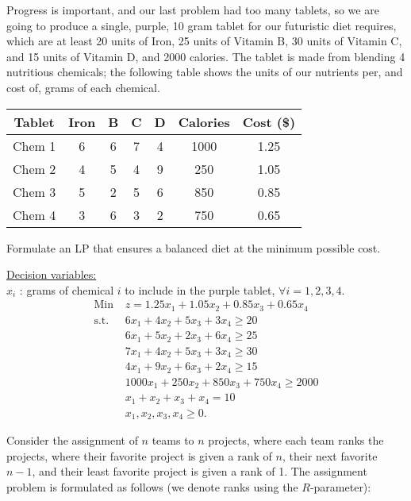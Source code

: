  Progress is important, and our last problem had too many tablets, so we are going to produce a single, purple, 10 gram tablet for our futuristic diet requires, which are at least 20 units of Iron, 25 units of Vitamin B, 30 units of Vitamin C, and 15 units of Vitamin D, and 2000 calories. The tablet is made from blending 4 nutritious chemicals; the following table shows the units of our nutrients per, and cost of, grams of each chemical.
\begin{table}[h!] \begin{center} \begin{tabular} {|c|c|c|c|c|c|c|}
\hline Tablet  & Iron  &  B &  C &  D & Calories & Cost (\$) \\ \hline
\hline  Chem 1  & 6    & 6         & 7         & 4         &  1000    & 1.25 \\
\hline  Chem 2  & 4    & 5         & 4         & 9         &  250     & 1.05 \\
\hline  Chem 3  & 5    & 2         & 5         & 6         &  850     & 0.85 \\
\hline  Chem 4  & 3    & 6         & 3         & 2         &  750     & 0.65 \\
\hline
\end{tabular} \end{center} \end{table}
Formulate an LP that ensures a balanced diet at the minimum possible cost.

\smallskip \underline{Decision variables:} \\
$x_i$ : grams of chemical $i$ to include in the purple tablet, $\forall i = 1,2,3,4$.
\begin{align*}
\mbox{Min} & z = 1.25x_1 + 1.05x_2 + 0.85x_3 + 0.65x_4 \\
\mbox{s.t.~~} &  6x_1 + 4x_2 + 5x_3 + 3x_4 \ge 20 \\
& 6x_1 + 5x_2 + 2x_3 + 6x_4 \ge 25  \\
& 7x_1 + 4x_2 + 5x_3 + 3x_4 \ge 30  \\
& 4x_1 + 9x_2 + 6x_3 + 2x_4 \ge 15  \\
& 1000x_1 + 250x_2 + 850x_3 + 750x_4 \ge 2000 \\
& x_1 + x_2 + x_3 + x_4 = 10  \\
& x_1, x_2, x_3, x_4 \ge 0. 
\end{align*}

 Consider the assignment of $n$ teams to $n$ projects, where each team ranks the projects, where their favorite project is given a rank of $n$, their next favorite $n-1$, and their least favorite project is given a rank of 1.  The assignment problem is formulated as follows (we denote ranks using the $R$-parameter):

